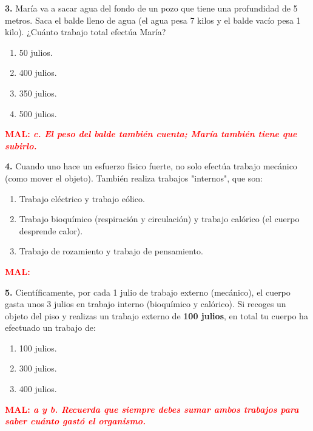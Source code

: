 \documentclass[12pt, letterpaper]{article}
\newif\ifshowanswers
\newcommand{\retroalimentacion}[3]{
	\ifshowanswers
	\vspace{0.2cm}
	\noindent\textcolor{gray}{\rule{\textwidth}{2pt}} %
	\par\vspace{0.1cm}
	\noindent \textbf{\textcolor{blue}{BIEN: #1 \quad \textit{(#2)}}}
	
	\if\relax\detokenize{#3}\relax
	\else
	\par\vspace{0.1cm}
	\noindent \textbf{\textcolor{red}{MAL: \textit{#3}}}
	\fi
	\vspace{0.6cm}
	\else
	\vspace{1.2cm} %
	\fi
}
\begin{document}
	\noindent \textbf{3.} María va a sacar agua del fondo de un pozo que tiene una profundidad de 5 metros. Saca el balde lleno de agua (el agua pesa 7 kilos y el balde vacío pesa 1 kilo). ¿Cuánto trabajo total efectúa María?
	\begin{enumerate}[label=\alph*)]
		\item 50 julios.
		\item 400 julios.
		\item 350 julios.
		\item 500 julios.
	\end{enumerate}
	\retroalimentacion{b}{El peso total que levanta María es de 8 kilos (7 de agua + 1 del balde). 8 kilos x 5 metros x 10 = 400 julios de trabajo mecánico.}{c. El peso del balde también cuenta; María también tiene que subirlo.}
	
	\noindent \textbf{4.} Cuando uno hace un esfuerzo físico fuerte, no solo efectúa trabajo mecánico (como mover el objeto). También realiza trabajos "internos", que son:
	\begin{enumerate}[label=\alph*)]
		\item Trabajo eléctrico y trabajo eólico.
		\item Trabajo bioquímico (respiración y circulación) y trabajo calórico (el cuerpo desprende calor).
		\item Trabajo de rozamiento y trabajo de pensamiento.
	\end{enumerate}
	\retroalimentacion{b}{Cuando haces ejercicio, la respiración y los latidos se aceleran (trabajo bioquímico) y el cuerpo desprende gran cantidad de calor.}{}
	
	\noindent \textbf{5.} Científicamente, por cada 1 julio de trabajo externo (mecánico), el cuerpo gasta unos 3 julios en trabajo interno (bioquímico y calórico). Si recoges un objeto del piso y realizas un trabajo externo de \textbf{100 julios}, en total tu cuerpo ha efectuado un trabajo de:
	\begin{enumerate}[label=\alph*)]
		\item 100 julios.
		\item 300 julios.
		\item 400 julios.
	\end{enumerate}
	\retroalimentacion{c}{100 julios de trabajo externo (mecánico) más el triple de trabajo interno (300 julios). Total: 100 + 300 = 400 julios.}{a y b. Recuerda que siempre debes sumar ambos trabajos para saber cuánto gastó el organismo.}
	
\end{document}
